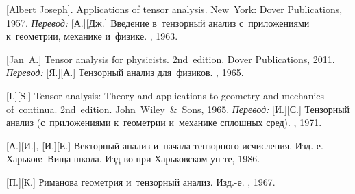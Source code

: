 \begin{thebibliography}{123}
\begin{otherlanguage}{russian}
[Albert Joseph]. Applications of tensor analysis. New~York: Dover Publications, 1957. 
\emph{Перевод:} [А.][Дж.] Введение в~тензорный анализ с~приложениями к~геометрии, механике и~физике. \fizmatgiz, 1963. 

[Jan~A.] Tensor analysis for physicists. 2nd~edition. Dover Publications, 2011. 
\emph{Перевод:} [Я.][А.] Тензорный анализ для~физиков. \naukapublisher, 1965. 

[I.][S.] Tensor analysis: Theory and applications to geometry and mechanics of~continua. 2nd~edition. John~Wiley~\&~Sons, 1965. 
\emph{Перевод:} [И.][С.] Тензорный анализ (с~приложениями к~геометрии и~механике сплошных сред). \naukapublisher, 1971. 

[А.][И.], [И.][Е.] Векторный анализ и~начала тензорного исчисления. Изд.\hbox{-}е. Харьков:~Вища школа. Изд\hbox{-}во при Харь\-ков\-ском ун\hbox{-}те, 1986. 

[П.][К.] Риманова геометрия и~тензорный анализ. Изд.\hbox{-}е. \naukapublisher, 1967. 

%
%





\end{otherlanguage}
\end{thebibliography}
